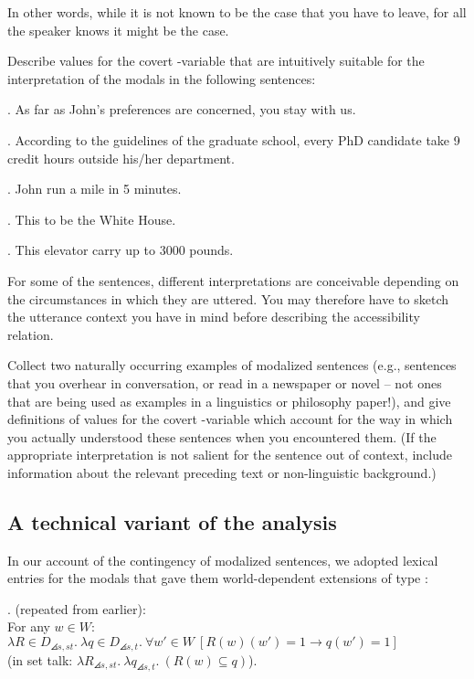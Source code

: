 In other words, while it is not known to be the case that you have to leave, for all the speaker knows it might be the case.
\begin{exercise}
	
	Describe values for the covert -variable that are intuitively suitable for the interpretation of the modals in the following sentences:
	
	\ex. As far as John's preferences are concerned, you  stay with us.
	
	\ex. According to the guidelines of the graduate school, every PhD candidate  take 9 credit hours outside his/her department.
	
	\ex. John  run a mile in 5 minutes.
	
	\ex. This  to be the White House.
	
	\ex. This elevator  carry up to 3000 pounds.
	
	For some of the sentences, different interpretations are conceivable depending on the circumstances in which they are uttered. You may therefore have to sketch the utterance context you have in mind before describing the accessibility relation. \eex
\end{exercise}
\begin{exercise}
	
	Collect two naturally occurring examples of modalized sentences (e.g., sentences that you overhear in conversation, or read in a newspaper or novel -- not ones that are being used as examples in a linguistics or philosophy paper!), and give definitions of values for the covert -variable which account for the way in which you actually understood these sentences when you encountered them. (If the appropriate interpretation is not salient for the sentence out of context, include information about the relevant preceding text or non-linguistic background.) \eex
\end{exercise}

\subsection{A technical variant of the analysis}\label{techvariant}

In our account of the contingency of modalized sentences, we adopted lexical entries for the modals that gave them world-dependent extensions of type :

\ex. (repeated from earlier):\\
For any $w \in W$: \\
$\lambda R\in D_{\angles{s,st}}.\ \lambda q\in D_{\angles{s,t}}.\ \forall w'\in W\ [R(w)(w') =1 \rightarrow q(w')=1]$\\
\null\hfill(in set talk: $\lambda R_{\angles{s,st}}.\ \lambda q_{\angles{s,t}}.\ (R(w)\ensuremath{\subseteq}q)$).


